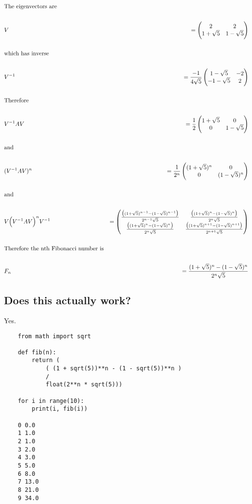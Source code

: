 \begin{align*}
&\text{The eigenvectors are}
\\\\
&V &= \begin{pmatrix}2           & 2          \\1 + \sqrt 5 & 1 - \sqrt 5\\ \end{pmatrix}
\\\\
&\text{which has inverse}
\\\\
&V^{-1} &= \frac{-1}{4\sqrt 5} \begin{pmatrix}1 - \sqrt 5  & -2\\-1 - \sqrt 5 & 2\\ \end{pmatrix}
\\\\
&\text{Therefore}
\\\\
&V^{-1}AV &= \frac{1}{2} \begin{pmatrix}1 + \sqrt 5 & 0          \\0           & 1 - \sqrt 5\\ \end{pmatrix}
\\\\
&\text{and}
\\\\
&(V^{-1}AV)^n &= \frac{1}{2^n} \begin{pmatrix}(1 + \sqrt 5)^n & 0          \\0                 & (1 - \sqrt 5)^n\\ \end{pmatrix}
\\\\
&\text{and}
\\\\
&V \Big(V^{-1}AV\Big)^n V^{-1} &=
\begin{pmatrix}\frac{\big((1 + \sqrt 5)^{n-1} - (1 - \sqrt 5)^{n-1}\big)}{2^{n-1}\sqrt 5} & \frac{\big((1 + \sqrt 5)^n     - (1 - \sqrt 5)^n    \big)}{2^n    \sqrt 5}\\\frac{\big((1 + \sqrt 5)^n     - (1 - \sqrt 5)^n    \big)}{2^n    \sqrt 5} & \frac{\big((1 + \sqrt 5)^{n+1} - (1 - \sqrt 5)^{n+1}\big)}{2^{n+1}\sqrt 5}\\ \end{pmatrix}
\\\\
&\text{Therefore the nth Fibonacci number is}
\\\\
&F_n &= \frac{(1 + \sqrt 5)^n     - (1 - \sqrt 5)^n}
             {2^n    \sqrt 5}
\end{align*}

\newpage
\subsection*{Does this actually work?}

Yes.

\begin{verbatim}
    from math import sqrt

    def fib(n):
        return (
            ( (1 + sqrt(5))**n - (1 - sqrt(5))**n )
            /
            float(2**n * sqrt(5)))

    for i in range(10):
        print(i, fib(i))

    0 0.0
    1 1.0
    2 1.0
    3 2.0
    4 3.0
    5 5.0
    6 8.0
    7 13.0
    8 21.0
    9 34.0
\end{verbatim}


